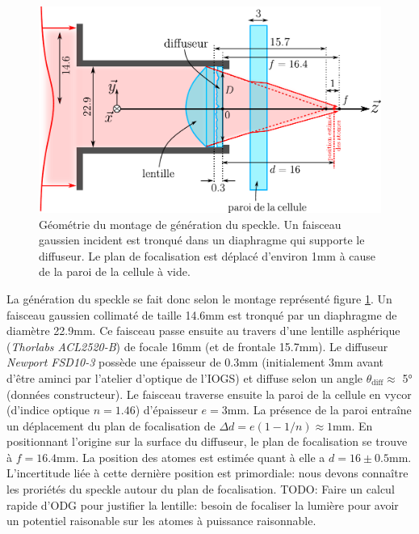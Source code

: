\begin{figure}
\centering
\includegraphics[scale=0.7]{Fig/Speckle/montage_diffuseur.pdf}
\caption{Géométrie du montage de génération du speckle. Un faisceau gaussien incident est tronqué dans un diaphragme qui supporte le diffuseur. Le plan de focalisation est déplacé d'environ 1mm à cause de la paroi de la cellule à vide.}
\label{fig:montage_diffuseur}
\end{figure}

La génération du speckle se fait donc selon le montage représenté figure \ref{fig:montage_diffuseur}. Un faisceau gaussien collimaté de taille 14.6mm est tronqué par un diaphragme de diamètre 22.9mm. Ce faisceau passe ensuite au travers d'une lentille asphérique (\textit{Thorlabs ACL2520-B}) de focale 16mm (et de frontale 15.7mm). Le diffuseur \textit{Newport FSD10-3} possède une épaisseur de 0.3mm (initialement 3mm avant d'être aminci par l'atelier d'optique de l'IOGS) et diffuse selon un angle $\theta_{\mathrm{diff}}\approx$ 5° (données constructeur). Le faisceau traverse ensuite la paroi de la cellule en vycor (d'indice optique $n=1.46$) d'épaisseur $e=3$mm. La présence de la paroi entraîne un déplacement du plan de focalisation de $\Delta d=e(1-1/n)\approx1$mm. En positionnant l'origine sur la surface du diffuseur, le plan de focalisation se trouve à $f=16.4$mm. La position des atomes est estimée quant à elle a $d=16\pm0.5$mm. L'incertitude liée à cette dernière position est primordiale: nous devons connaître les proriétés du speckle autour du plan de focalisation. 
{\Large TODO: Faire un calcul rapide d'ODG pour justifier la lentille: besoin de focaliser la lumière pour avoir un potentiel raisonable sur les atomes à puissance raisonnable.}



